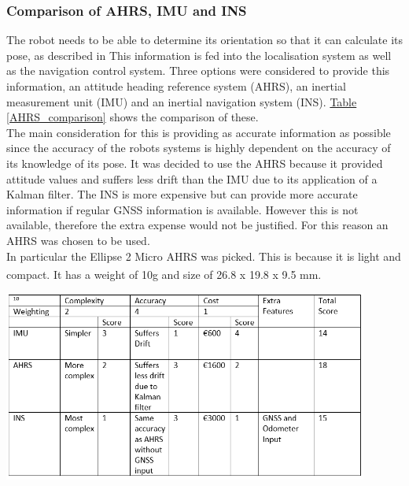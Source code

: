 \documentclass[11pt]{article}		%
\newcommand{\supercite}[1]{\textsuperscript{\cite{#1}}}		%
\newcommand{\tableref}[1]{\hyperref[#1]{Table \ref*{#1}}}     %
\begin{document}
            \subsubsection{Comparison of AHRS, IMU and INS}
            
            The robot needs to be able to determine its orientation so that it can calculate its pose, as described in 
            This information is fed into the localisation system as well as the navigation control system. 
            Three options were considered to provide this information, an attitude heading reference system (AHRS), an inertial measurement unit (IMU) and an inertial navigation system (INS). \tableref{AHRS_comparison} shows the comparison of these.
            \\
            The main consideration for this is providing as accurate information as possible since the accuracy of the robots systems is highly dependent on the accuracy of its knowledge of its pose. 
            It was decided to use the AHRS because it provided attitude values and suffers less drift than the IMU due to its application of a Kalman filter. 
            The INS is more expensive but can provide more accurate information if regular GNSS information is available. 
            However this is not available, therefore the extra expense would not be justified. For this reason an AHRS was chosen to be used.
            \\
            In particular the Ellipse 2 Micro AHRS was picked.
            This is because it is light and compact. It has a weight of 10g and size of 26.8 x 19.8 x 9.5 mm. \supercite{Ellipse_Ahrs}
            
            \begin{table}[h]
					\centering
				    \includegraphics[width=0.9\textwidth]{Table_comparing_AHRS_INS_IMU.PNG}
						\caption{}
						\label{AHRS_comparison}
				\end{table}
				
\end{document}
